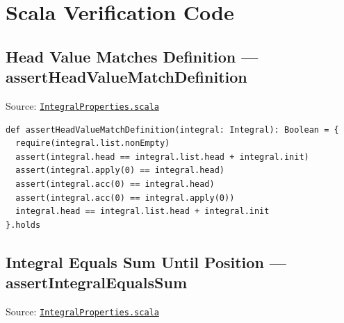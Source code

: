 \section{Scala Verification Code}
\label{sec:appendix-a}

\subsection{Head Value Matches Definition --- assertHeadValueMatchDefinition}

Source:
\href{https://github.com/thiagomata/prime-numbers/blob/master/src/main/scala/v1/chapter3/list/integral/properties/IntegralProperties.scala}{\texttt{IntegralProperties.scala}}

\begin{lstlisting}[style=scala]
def assertHeadValueMatchDefinition(integral: Integral): Boolean = {
  require(integral.list.nonEmpty)
  assert(integral.head == integral.list.head + integral.init)
  assert(integral.apply(0) == integral.head)
  assert(integral.acc(0) == integral.head)
  assert(integral.acc(0) == integral.apply(0))
  integral.head == integral.list.head + integral.init
}.holds
\end{lstlisting}

\subsection{Integral Equals Sum Until Position --- assertIntegralEqualsSum}

Source:
\href{https://github.com/thiagomata/prime-numbers/blob/master/src/main/scala/v1/chapter3/list/integral/properties/IntegralProperties.scala}{\texttt{IntegralProperties.scala}}

